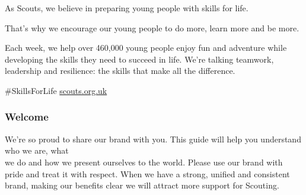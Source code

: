 \begin{frame}
\vspace{6mm}
As Scouts, we believe in preparing young people with skills
for life.
\vspace{0.35\baselineskip}

That’s why we encourage our young people to do more,
learn more and be more.
\vspace{0.35\baselineskip}

Each week, we help over 460,000 young people enjoy fun
and adventure while developing the skills they need to
succeed in life. We’re talking teamwork, leadership and
resilience: the skills that make all the difference.

\vspace{0.35\baselineskip}
\alert{\selectfont\#SkillsForLife}\linebreak
\alert{\href{https://scouts.org.uk}{scouts.org.uk}}
\end{frame}

\begin{frame}
\frametitle{Welcome}
\begin{minipage}[t]{1.1\textwidth}%
\raggedright%
We’re so proud to share our brand with you. This guide will
help you understand who we are, what\\
we do and how we present ourselves to the world. Please
use our brand with pride and treat it with respect. When we
have a strong, unified and consistent brand, making our
benefits clear we will attract more support for Scouting.
\end{minipage}
\end{frame}


